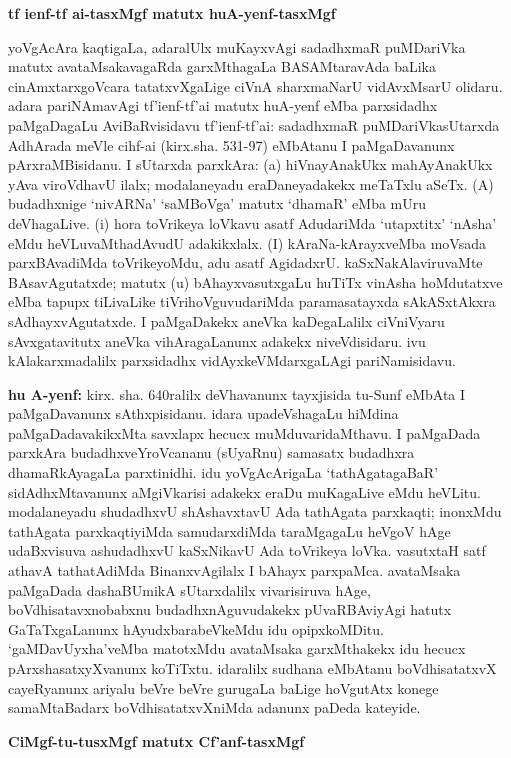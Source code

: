\begin{center}
{\textbf{\Large tf ienf-tf ai-tasxMgf matutx huA-yenf-tasxMgf}}
\end{center}

yoVgAcAra kaqtigaLa, adaralUlx muKayxvAgi sadadhxmaR puMDariVka matutx avataMsakavagaRda garxMthagaLa BASAMtaravAda baLika cinAmxtarxgoVcara tatatxvXgaLige ciVnA sharxmaNarU vidAvxMsarU olidaru. adara pariNAmavAgi tf'ienf-tf'ai matutx huA-yenf eMba parxsidadhx paMgaDagaLu AviBaRvisidavu tf'ienf-tf'ai: sadadhxmaR puMDariVkasUtarxda AdhArada meVle cihf-ai (kirx.sha. 531-97) eMbAtanu I paMgaDavanunx pArxraMBisidanu. I sUtarxda parxkAra: (a) hiVnayAnakUkx mahAyAnakUkx yAva viroVdhavU ilalx; modalaneyadu eraDaneyadakekx meTaTxlu aSeTx. (A) budadhxnige `nivARNa' `saMBoVga' matutx `dhamaR' eMba mUru deVhagaLive. (i) hora toVrikeya loVkavu asatf AdudariMda `utapxtitx' `nAsha' eMdu heVLuvaMthadAvudU adakikxlalx. (I) kAraNa-kArayxveMba moVsada parxBAvadiMda toVrikeyoMdu, adu asatf AgidadxrU. kaSxNakAlaviruvaMte BAsavAgutatxde; matutx (u) bAhayxvasutxgaLu huTiTx vinAsha hoMdutatxve eMba tapupx tiLivaLike tiVrihoVguvudariMda paramasatayxda sAkASxtAkxra sAdhayxvAgutatxde. I paMgaDakekx aneVka kaDegaLalilx ciVniVyaru sAvxgatavitutx aneVka vihAragaLanunx adakekx niveVdisidaru. ivu kAlakarxmadalilx parxsidadhx vidAyxkeVMdarxgaLAgi pariNamisidavu.

\smallskip
{\bf hu A-yenf:} kirx. sha. 640ralilx deVhavanunx tayxjisida tu-Sunf eMbAta I paMgaDavanunx sAthxpisidanu. idara upadeVshagaLu hiMdina paMgaDadavakikxMta savxlapx hecucx muMduvaridaMthavu. I paMgaDada parxkAra budadhxveYroVcananu (sUyaRnu) samasatx budadhxra dhamaRkAyagaLa parxtinidhi. idu yoVgAcArigaLa `tathAgatagaBaR' sidAdhxMtavanunx aMgiVkarisi adakekx eraDu muKagaLive eMdu heVLitu. modalaneyadu shudadhxvU shAshavxtavU Ada tathAgata parxkaqti; inonxMdu tathAgata parxkaqtiyiMda samudarxdiMda taraMgagaLu heVgoV hAge udaBxvisuva ashudadhxvU kaSxNikavU Ada toVrikeya loVka. vasutxtaH satf athavA tathatAdiMda BinanxvAgilalx I bAhayx parxpaMca. avataMsaka paMgaDada dashaBUmikA sUtarxdalilx vivarisiruva hAge, boVdhisatavxnobabxnu budadhxnAguvudakekx pUvaRBAviyAgi hatutx GaTaTxgaLanunx hAyudxbarabeVkeMdu idu opipxkoMDitu. `gaMDavUyxha'veMba matotxMdu avataMsaka garxMthakekx idu hecucx pArxshasatxyXvanunx koTiTxtu. idaralilx sudhana eMbAtanu boVdhisatatxvX cayeRyanunx ariyalu beVre beVre gurugaLa baLige hoVgutAtx konege samaMtaBadarx boVdhisatatxvXniMda adanunx paDeda kateyide.

\newpage

\begin{center}
{\textbf{\Large CiMgf-tu-tusxMgf matutx Cf'anf-tasxMgf}}
\end{center}

